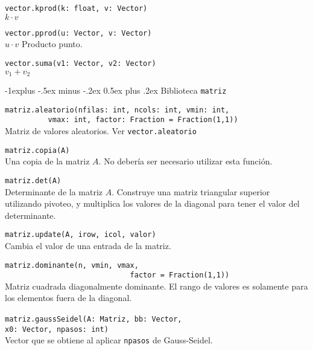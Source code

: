 \documentclass[10pt,landscape]{article}
\makeatletter
\renewcommand{\subsection}{\@startsection{subsection}{2}{0mm}%
                                {-1explus -.5ex minus -.2ex}%
                                {0.5ex plus .2ex}%
                                {\normalfont\normalsize\bfseries}}
\makeatother
\begin{document}
\begin{multicols}{3}
\begin{asparaitem}
\item \verb|vector.kprod(k: float, v: Vector)| \\
\quad $k\cdot v$

\item \verb|vector.pprod(u: Vector, v: Vector)| \\
\quad $u\cdot v$ Producto punto.

\item \verb|vector.suma(v1: Vector, v2: Vector)| \\
\quad $v_1 + v_2$
\end{asparaitem}

\subsection{Biblioteca \texttt{matriz}}

\begin{asparaitem}
\item \verb|matriz.aleatorio(nfilas: int, ncols: int, vmin: int,| \\
  \verb|          vmax: int, factor: Fraction = Fraction(1,1))| \\
  \quad Matriz de valores aleatorios. Ver \verb|vector.aleatorio|

\item \verb|matriz.copia(A)| \\
  \quad Una copia de la matriz $A$. No deber\'ia ser necesario utilizar esta funci\'on.

\item \verb|matriz.det(A)| \\
  \quad Determinante de la matriz $A$. Construye una matriz triangular superior utilizando pivoteo, y multiplica los valores de la diagonal para tener el valor del determinante.

\item \verb|matriz.update(A, irow, icol, valor)| \\
  \quad Cambia el valor de una entrada de la matriz.

\item \verb|matriz.dominante(n, vmin, vmax,| \\
  \verb|                             factor = Fraction(1,1))| \\
    \quad Matriz cuadrada diagonalmente dominante. El rango de valores es solamente para los elementos fuera de la diagonal.

\item \verb|matriz.gaussSeidel(A: Matriz, bb: Vector,|
  \verb|                            x0: Vector, npasos: int)|\\
  \quad Vector que se obtiene al aplicar \verb|npasos| de Gauss-Seidel.


\end{asparaitem}
\end{multicols}
\end{document}
